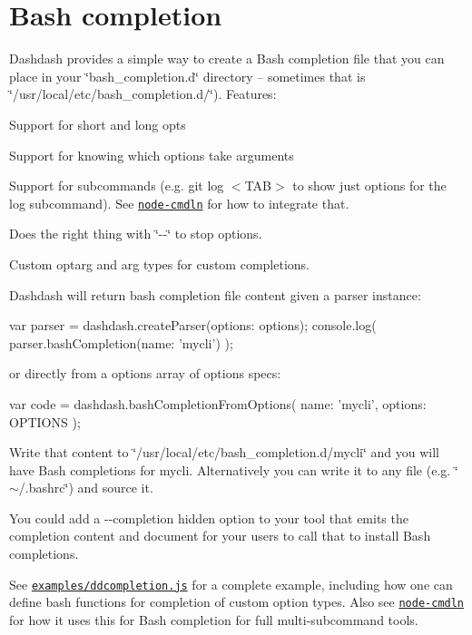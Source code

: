 \section*{Bash completion}

Dashdash provides a simple way to create a Bash completion file that you can place in your \char`\"{}bash\+\_\+completion.\+d\char`\"{} directory -- sometimes that is \char`\"{}/usr/local/etc/bash\+\_\+completion.\+d/\char`\"{}). Features\+:


\begin{DoxyItemize}
\item Support for short and long opts
\item Support for knowing which options take arguments
\item Support for subcommands (e.\+g. \textquotesingle{}git log $<$\+T\+A\+B$>$\textquotesingle{} to show just options for the log subcommand). See \href{https://github.com/trentm/node-cmdln#bash-completion}{\tt node-\/cmdln} for how to integrate that.
\item Does the right thing with \char`\"{}-\/-\/\char`\"{} to stop options.
\item Custom optarg and arg types for custom completions.
\end{DoxyItemize}

Dashdash will return bash completion file content given a parser instance\+: \begin{DoxyVerb}var parser = dashdash.createParser({options: options});
console.log( parser.bashCompletion({name: 'mycli'}) );
\end{DoxyVerb}


or directly from a {\ttfamily options} array of options specs\+: \begin{DoxyVerb}var code = dashdash.bashCompletionFromOptions({
    name: 'mycli',
    options: OPTIONS
});
\end{DoxyVerb}


Write that content to \char`\"{}/usr/local/etc/bash\+\_\+completion.\+d/mycli\char`\"{} and you will have Bash completions for {\ttfamily mycli}. Alternatively you can write it to any file (e.\+g. \char`\"{}$\sim$/.\+bashrc\char`\"{}) and source it.

You could add a {\ttfamily -\/-\/completion} hidden option to your tool that emits the completion content and document for your users to call that to install Bash completions.

See \href{examples/ddcompletion.js}{\tt examples/ddcompletion.\+js} for a complete example, including how one can define bash functions for completion of custom option types. Also see \href{https://github.com/trentm/node-cmdln}{\tt node-\/cmdln} for how it uses this for Bash completion for full multi-\/subcommand tools.


